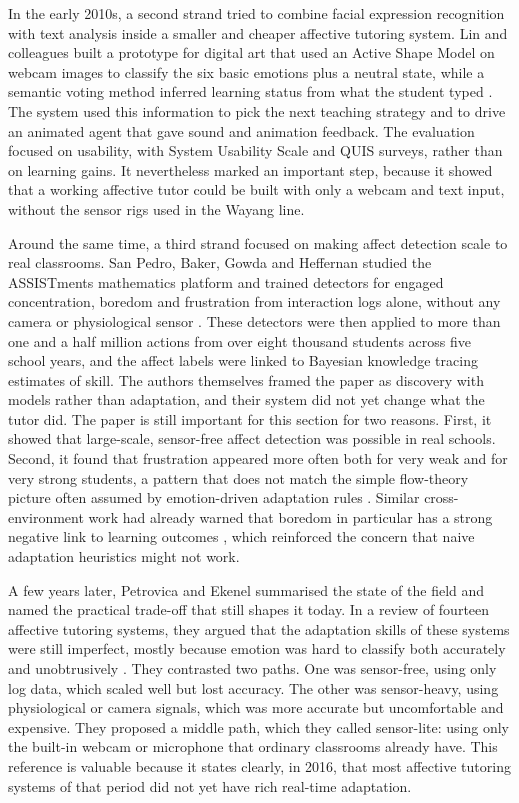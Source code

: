 In the early 2010s, a second strand tried to combine facial expression recognition with text analysis inside a smaller and cheaper affective tutoring system. Lin and colleagues built a prototype for digital art that used an Active Shape Model on webcam images to classify the six basic emotions plus a neutral state, while a semantic voting method inferred learning status from what the student typed \cite{lin_employing_2012}. The system used this information to pick the next teaching strategy and to drive an animated agent that gave sound and animation feedback. The evaluation focused on usability, with System Usability Scale and QUIS surveys, rather than on learning gains. It nevertheless marked an important step, because it showed that a working affective tutor could be built with only a webcam and text input, without the sensor rigs used in the Wayang line.

Around the same time, a third strand focused on making affect detection scale to real classrooms. San Pedro, Baker, Gowda and Heffernan studied the ASSISTments mathematics platform and trained detectors for engaged concentration, boredom and frustration from interaction logs alone, without any camera or physiological sensor \cite{san_pedro_towards_2013}. These detectors were then applied to more than one and a half million actions from over eight thousand students across five school years, and the affect labels were linked to Bayesian knowledge tracing estimates of skill. The authors themselves framed the paper as discovery with models rather than adaptation, and their system did not yet change what the tutor did. The paper is still important for this section for two reasons. First, it showed that large-scale, sensor-free affect detection was possible in real schools. Second, it found that frustration appeared more often both for very weak and for very strong students, a pattern that does not match the simple flow-theory picture often assumed by emotion-driven adaptation rules \cite{san_pedro_towards_2013}. Similar cross-environment work had already warned that boredom in particular has a strong negative link to learning outcomes \cite{Baker2010BetterFrustratedThanBored}, which reinforced the concern that naive adaptation heuristics might not work.

A few years later, Petrovica and Ekenel summarised the state of the field and named the practical trade-off that still shapes it today. In a review of fourteen affective tutoring systems, they argued that the adaptation skills of these systems were still imperfect, mostly because emotion was hard to classify both accurately and unobtrusively \cite{petrovica_emotion_2016}. They contrasted two paths. One was sensor-free, using only log data, which scaled well but lost accuracy. The other was sensor-heavy, using physiological or camera signals, which was more accurate but uncomfortable and expensive. They proposed a middle path, which they called sensor-lite: using only the built-in webcam or microphone that ordinary classrooms already have. This reference is valuable because it states clearly, in 2016, that most affective tutoring systems of that period did not yet have rich real-time adaptation.

